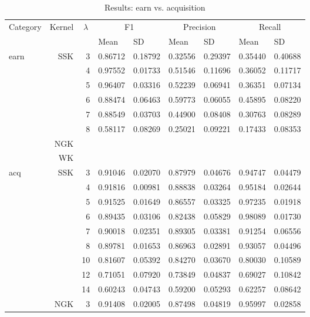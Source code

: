 \documentclass{article}
\theoremstyle{definition}
\begin{document}
\begin{table}[]
\centering
\caption{Results: earn vs. acquisition}
\label{}
\begin{tabular}{|l|r|r|r|r|r|r|r|r|}
\hline
\multicolumn{1}{|c|}{Category} & 
\multicolumn{1}{c|}{Kernel} & 
\multicolumn{1}{c|}{$\lambda$} & 
\multicolumn{2}{c|}{F1} & 
\multicolumn{2}{c|}{Precision} & 
\multicolumn{2}{c|}{Recall}\\
&
\multicolumn{1}{l|}{} & 
\multicolumn{1}{l|}{} & 
\multicolumn{1}{l|}{Mean} & \multicolumn{1}{l|}{SD} & \multicolumn{1}{l|}{Mean} & \multicolumn{1}{l|}{SD} & \multicolumn{1}{l|}{Mean} & \multicolumn{1}{l|}{SD} \\ \hline
\multirow{8}{*}{earn}  
&  SSK & 3  &0.86712 &0.18792 &0.32556 &0.29397 &0.35440 &0.40688  \\
&  & 4  &0.97552 &0.01733 &0.51546 &0.11696 &0.36052 &0.11717  \\
&  & 5   &0.96407 &0.03316 &0.52239 &0.06941 &0.36351 &0.07134\\ 
&  & 6  &0.88474 &0.06463 &0.59773 &0.06055 &0.45895 &0.08220\\ 
&  & 7 &0.88549 &0.03703 &0.44900 &0.08408 &0.30763 &0.08289\\ 
&  & 8 &0.58117 &0.08269 &0.25021 &0.09221 &0.17433 &0.08353\\ 
   \cline{2-9} 
   & NGK &   &   & &   & &   &\\ \cline{2-9} 
   & WK  &   &   & &   & &   & \\ \hline
\multirow{19}{*}{acq}    
   & SSK & 3 &0.91046 &0.02070 &0.87979 &0.04676 &0.94747 &0.04479\\
   &   & 4   &0.91816 &0.00981 &0.88838 &0.03264 &0.95184 &0.02644\\
   &   & 5   &0.91525 &0.01649 &0.86557 &0.03325 &0.97235 &0.01918\\
   &   & 6   &0.89435 &0.03106 &0.82438 &0.05829 &0.98089 &0.01730\\
   &   & 7   &0.90018 &0.02351 &0.89305 &0.03381 &0.91254 &0.06556\\
   &   & 8   &0.89781 &0.01653 &0.86963 &0.02891 &0.93057 &0.04496\\
   &   & 10  &0.81607 &0.05392 &0.84270 &0.03670 &0.80030 &0.10589\\
   &   & 12  &0.71051 &0.07920 &0.73849 &0.04837 &0.69027 &0.10842\\
   &   & 14  &0.60243 &0.04743 &0.59200 &0.05293 &0.62257 &0.08642\\ \cline{2-9} 
   & NGK & 3   &0.91408 &0.02005 &0.87498 &0.04819 &0.95997 &0.02858\\

\end{tabular}
\end{table}
\end{document}

